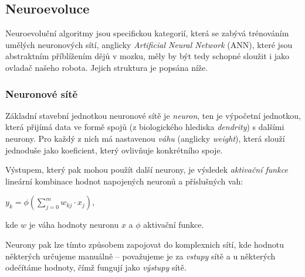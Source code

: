 \documentclass[a4]{article}
\begin{document}
\subsection{Neuroevoluce}
Neuroevoluční algoritmy jsou specifickou kategorií, která se zabývá trénováním umělých neuronových sítí, anglicky \emph{Artificial Neural Network} (ANN), které jsou abstraktním příblížením dějů v mozku, měly by být tedy schopné sloužit i jako ovladač našeho robota. Jejich struktura je popsána níže.
\subsubsection{Neuronové sítě}
Základní stavební jednotkou neuronové sítě je \emph{neuron}, ten je výpočetní jednotkou, která přijímá data ve formě spojů (z biologického hlediska \emph{dendrity}) s dalšími neurony. Pro každý z nich má nastavenou \emph{váhu} (anglicky \emph{weight}), která slouží jednoduše jako koeficient, který ovlivňuje  konkrétního spoje.\par
Výstupem, který pak mohou použít další neurony, je výsledek \emph{aktivační funkce} lineární kombinace hodnot napojených neuronů a příslušných vah\cite{neuron}:
\begin{center}$y_k=\phi(\sum_{j=0}^m w_{kj}\cdot x_j)$,\end{center}
kde $w$ je váha hodnoty neuronu $x$ a $\phi$ aktivační funkce.\par
Neurony pak lze tímto způsobem zapojovat do komplexnich sítí, kde hodnotu některých určujeme manuálně -- považujeme je za \emph{vstupy} sítě a u některých odečítáme hodnoty, čímž fungují jako \emph{výstupy} sítě.
\end{document}
